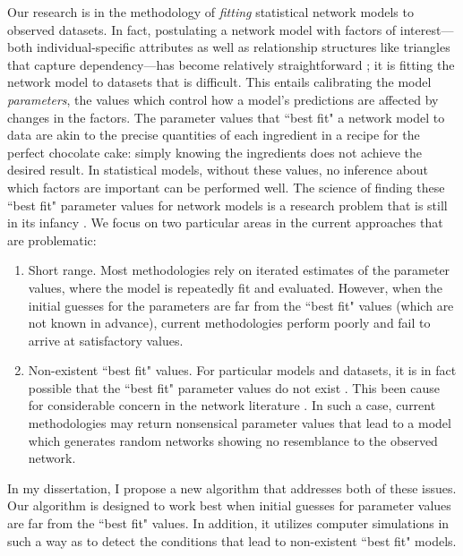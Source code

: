 \documentclass[12pt]{article}
\begin{document}
Our research is in the methodology of \emph{fitting} statistical network models to observed datasets.  
In fact, postulating a network model with factors of interest---both 
individual-specific attributes as well as relationship structures like
triangles that capture dependency---has become 
relatively straightforward \citep{Wasserman:1996,Morris:2008}; it is fitting
the network model to datasets that is difficult.  This entails calibrating 
the model \emph{parameters}, the values which control how a model's predictions 
are affected by changes in the factors.  
The parameter values that ``best fit" a network model to data are akin
 to the precise quantities of each ingredient in a recipe for the perfect 
 chocolate cake: simply knowing the ingredients does not achieve the
 desired result.  In statistical models, without these values,
 no inference about which factors are important can be performed well.
The science of finding these ``best fit" parameter values for network models 
is a research problem that is still in its infancy \citep{Hunter:2006}.  
We focus on two particular areas in the current approaches that are 
problematic:
\begin{enumerate}
\item Short range.  Most methodologies rely on iterated estimates of the parameter
values, where the model is repeatedly fit and evaluated.  
However, when the initial guesses for the parameters are far from the 
``best fit" values (which are not known in advance), current 
methodologies perform poorly and fail to arrive at satisfactory values.
\item Non-existent ``best fit" values.  For particular models and datasets, it is 
in fact possible that the ``best fit" parameter values do not exist \citep{Handcock:degeneracy,Rinaldo:2009}.  
This been cause for considerable concern in the network literature 
\citep{Handcock:2006,advancesp*,recentp*}.  In such a case, current 
methodologies may return nonsensical parameter values that lead to a model which generates 
random networks showing no resemblance to the observed network.  
\end{enumerate}
In my dissertation, I propose a new algorithm that addresses both of these 
issues.  Our algorithm is designed to work best when initial 
guesses for parameter values are far from the ``best fit" values.  In addition, it 
utilizes computer simulations in such a way as 
to detect the conditions that lead to non-existent ``best fit" models.
\end{document}
